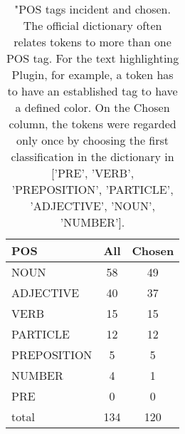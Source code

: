 \begin{table*}[h!]
\begin{center}
\caption{"POS tags incident and chosen.
            The official dictionary often relates tokens
            to more than one POS tag.
            For the text highlighting Plugin, for example,
            a token has to have an established tag to have
            a defined color.
            On the Chosen column, the tokens were regarded only once
            by choosing the first classification in the dictionary in ['PRE', 'VERB', 'PREPOSITION', 'PARTICLE', 'ADJECTIVE', 'NOUN', 'NUMBER'].}
\begin{tabular}{| l | c | c |}\hline
POS & All  & Chosen \\\hline
NOUN & 58  & 49 \\\hline
ADJECTIVE & 40  & 37 \\\hline
VERB & 15  & 15 \\\hline
PARTICLE & 12  & 12 \\\hline
PREPOSITION & 5  & 5 \\\hline
NUMBER & 4  & 1 \\\hline
PRE & 0  & 0 \\\hline
total & 134  & 120 \\\hline
\end{tabular}\end{center}
\end{table*}